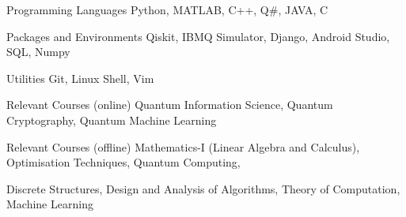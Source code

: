 

\begin{cvskills}

  \cvskill
    {Programming Languages} %
    {Python, MATLAB, C++, Q\#, JAVA, C} %

  \cvskill
    {Packages and Environments} %
    {Qiskit, IBMQ Simulator, Django, Android Studio, SQL, Numpy} %
    

  \cvskill
    {Utilities} %
    {Git, Linux Shell, Vim} %


  \cvskill
    {Relevant Courses (online)} %
    {Quantum Information Science, Quantum Cryptography, Quantum Machine Learning} %

    
  \cvskill
    {Relevant Courses (offline)}
    {Mathematics-I (Linear Algebra and Calculus), Optimisation Techniques, Quantum Computing, } 
    
  \cvskill
  {}
  {Discrete Structures, Design and Analysis of Algorithms, Theory of Computation, Machine Learning}
\end{cvskills}
